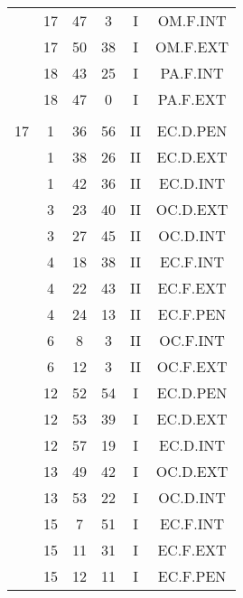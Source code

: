 \documentclass[12pt, a4paper]{article}
\begin{document}
\begin{multicols}{3}
{\begin{tabular}{c c c c c c}
	 	 	 	 & 17 & 47 & 3 & I & OM.F.INT\\%
	 	 	 	 & 17 & 50 & 38 & I & OM.F.EXT\\%
	 	 	 	 & 18 & 43 & 25 & I & PA.F.INT\\%
	 	 	 	 & 18 & 47 & 0 & I & PA.F.EXT\\%
	 	 	 	 & & & & & \\%
	 	 	 	17 & 1 & 36 & 56 & II & EC.D.PEN\\%
	 	 	 	 & 1 & 38 & 26 & II & EC.D.EXT\\%
	 	 	 	 & 1 & 42 & 36 & II & EC.D.INT\\%
	 	 	 	 & 3 & 23 & 40 & II & OC.D.EXT\\%
	 	 	 	 & 3 & 27 & 45 & II & OC.D.INT\\%
	 	 	 	 & 4 & 18 & 38 & II & EC.F.INT\\%
	 	 	 	 & 4 & 22 & 43 & II & EC.F.EXT\\%
	 	 	 	 & 4 & 24 & 13 & II & EC.F.PEN\\%
	 	 	 	 & 6 & 8 & 3 & II & OC.F.INT\\%
	 	 	 	 & 6 & 12 & 3 & II & OC.F.EXT\\%
	 	 	 	 & 12 & 52 & 54 & I & EC.D.PEN\\%
	 	 	 	 & 12 & 53 & 39 & I & EC.D.EXT\\%
	 	 	 	 & 12 & 57 & 19 & I & EC.D.INT\\%
	 	 	 	 & 13 & 49 & 42 & I & OC.D.EXT\\%
	 	 	 	 & 13 & 53 & 22 & I & OC.D.INT\\%
	 	 	 	 & 15 & 7 & 51 & I & EC.F.INT\\%
	 	 	 	 & 15 & 11 & 31 & I & EC.F.EXT\\%
	 	 	 	 & 15 & 12 & 11 & I & EC.F.PEN\\%

\end{tabular}}
\end{multicols}
\end{document}
